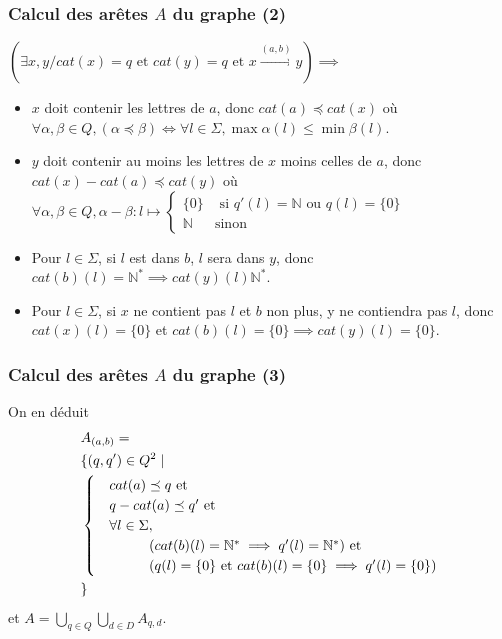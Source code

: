 \documentclass[12pt]{beamer}
\begin{document}
\begin{frame}\frametitle{Calcul des arêtes $A$ du graphe (2)}
$(\exists x,y / cat(x) = q \text{ et } cat(y) = q \text { et } x \overset{(a,b)}{\rightarrow} y) \implies$
\begin{itemize}
\item $x$ doit contenir les lettres de $a$, donc $cat(a) \preceq cat(x)$ où\\ $\forall \alpha, \beta \in Q, (\alpha \preceq \beta) \iff \forall l \in \Sigma, \max \alpha(l) \leq \min \beta(l)$.

\item $y$ doit contenir au moins les lettres de $x$ moins celles de $a$, donc $cat(x)-cat(a) \preceq cat(y)$ où\\ $\forall \alpha,\beta \in Q, \alpha-\beta : l \mapsto 
\begin{cases}
\{0\} & \text { si } q'(l) = \mathbb{N} \text{ ou }q(l) = \{0\}\\
\mathbb{N} & \text{sinon}
\end{cases}
$

\item Pour $l \in \Sigma$, si $l$ est dans $b$, $l$ sera dans $y$, donc $cat(b)(l) = \mathbb{N}^* \implies cat(y)(l) \mathbb{N}^*$. 

\item Pour $l \in \Sigma$, si $x$ ne contient pas $l$ et $b$ non plus, y ne contiendra pas $l$, donc $cat(x)(l) = \{0\}$ et $cat(b)(l) = \{0\} \implies cat(y)(l) = \{0\}$.

\end{itemize}

\end{frame}

\begin{frame}\frametitle{Calcul des arêtes $A$ du graphe (3)}

On en déduit
\begin{align*}
&A_{(a,b)} = \\
&\{(q,q') \in Q^2 \mid \\
&
\begin{cases}
    &cat(a) \preceq q \text{ et }\\
    &q-cat(a) \preceq q' \text{ et }\\ 
    &\forall l \in \Sigma,\\
    &\text{\hspace{1cm}}(cat(b)(l)=\mathbb{N}^* \implies q'(l)=\mathbb{N}^*) \text{ et }\\
    &\text{\hspace{1cm}}(q(l)=\{0\} \text{ et } cat(b)(l) = \{0\} \implies q'(l)=\{0\})
\end{cases}
\\
&\}
\end{align*}
et 
$A = \bigcup_{q \in Q}  \bigcup_{d \in D} A_{q,d}$.

\end{frame}
\end{document}
